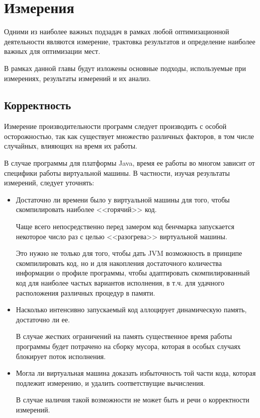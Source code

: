 \newpage
\section{Измерения}
Одними из наиболее важных подзадач в рамках любой оптимизационной деятельности являются измерение,
трактовка результатов и определение наиболее важных для оптимизации мест.

В рамках данной главы будут изложены основные подходы, используемые при измерениях, результаты
измерений и их анализ.

\subsection{Корректность}
Измерение производительности программ следует производить с особой осторожностью, так как существует
множество различных факторов, в том числе случайных, влияющих на время их работы.

В случае программы для платформы Java, время ее работы во многом зависит от специфики работы
виртуальной машины.
В частности, изучая результаты измерений, следует уточнять:
\begin{itemize}
    \item Достаточно ли времени было у виртуальной машины для того, чтобы скомпилировать наиболее
    <<горячий>> код.

    Чаще всего непосредственно перед замером код бенчмарка запускается некоторое число раз с целью
    <<разогрева>> виртуальной машины.

    Это нужно не только для того, чтобы дать JVM возможность в принципе скомпилировать код, но и
    для накопления достаточного количества информации о профиле программы, чтобы адаптировать
    скомпилированный код для наиболее частых вариантов исполнения, в т.ч. для удачного расположения
    различных процедур в памяти.

    \item Насколько интенсивно запускаемый код аллоцирует динамическую память, достаточно ли ее.

    В случае жестких ограничений на память существенное время работы программы будет потрачено
    на сборку мусора, которая в особых случаях блокирует поток исполнения.

    \item Могла ли виртуальная машина доказать избыточность той части кода, которая подлежит
    измерению, и удалить соответствущие вычисления.

    В случае наличия такой возможности не может быть и речи о корректности измерений.
\end{itemize}

